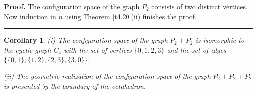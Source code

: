 \documentclass[a4paper, 11pt]{article}
\newtheorem{corollary}[theorem]{Corollary}
\newenvironment{proof}[1][Proof]{\textbf{#1.} }{\ \rule{0.5em}{0.5em}}
\begin{document}
\begin{proof}  The configuration space of the graph $P_2$ consists of two distinct vertices.  Now induction in $n$ using Theorem \ref{t4.20}(ii) finishes the proof. 
\end{proof}

\begin{corollary}\label{c4.22} {\rm (i)} The configuration space of the graph $P_2+P_2$ is isomorphic to  the cyclic  graph $C_4$ with the set of vertices $\{0,1,2,3\}$ and the set of edges $\{\{0,1\}, \{1,2\}, \{2,3\}, \{3,0\}\}$. 


{\rm (ii)} The geometric realization  of the configuration space of the graph $P_2+P_2+P_2$ is presented by the boundary of the  octahedron. 
\end{corollary}
\end{document}
